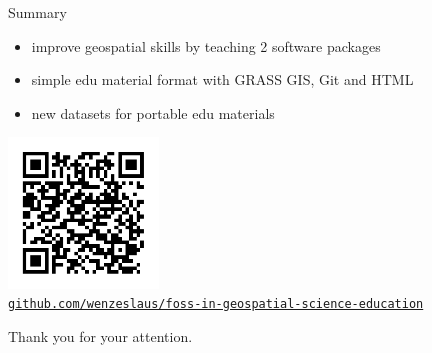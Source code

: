 \documentclass[xcolor={dvipsnames,usenames},beamer]{beamer}
\begin{document}
\begin{frame}{}

\begin{block}{Summary}
 \begin{itemize}
  \item improve geospatial skills by teaching 2 software packages
  \item simple edu material format with GRASS GIS, Git and HTML
  \item new datasets for portable edu materials
 \end{itemize}

\end{block}


\centering
\href{https://github.com/wenzeslaus/foss-in-geospatial-science-education}{%
\includegraphics[width=0.3\textwidth]{./images/general/slides_qr}\\%
\texttt{github.com/wenzeslaus/foss-in-geospatial-science-education}%
}

\bigskip

Thank you for your attention.

\end{frame}
\end{document}
